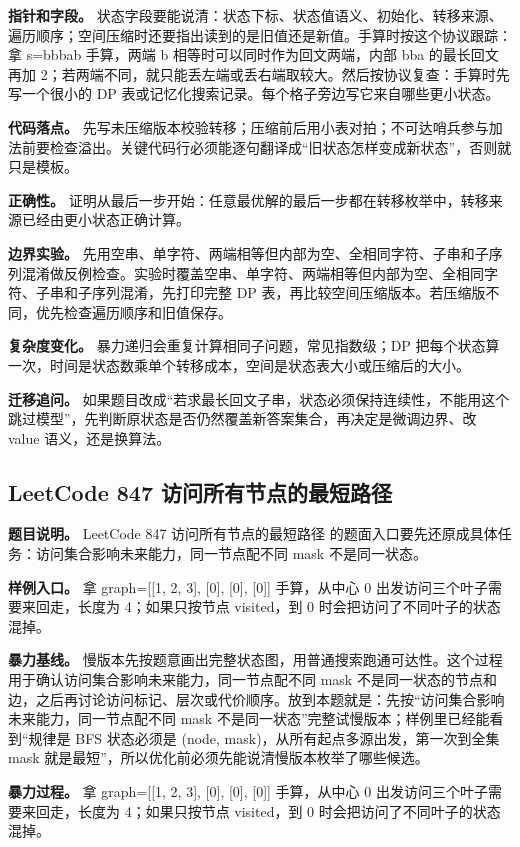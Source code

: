\textbf{指针和字段。} 状态字段要能说清：状态下标、状态值语义、初始化、转移来源、遍历顺序；空间压缩时还要指出读到的是旧值还是新值。手算时按这个协议跟踪：拿 s=bbbab 手算，两端 b 相等时可以同时作为回文两端，内部 bba 的最长回文再加 2；若两端不同，就只能丢左端或丢右端取较大。然后按协议复查：手算时先写一个很小的 DP 表或记忆化搜索记录。每个格子旁边写它来自哪些更小状态。

\textbf{代码落点。} 先写未压缩版本校验转移；压缩前后用小表对拍；不可达哨兵参与加法前要检查溢出。关键代码行必须能逐句翻译成“旧状态怎样变成新状态”，否则就只是模板。

\textbf{正确性。} 证明从最后一步开始：任意最优解的最后一步都在转移枚举中，转移来源已经由更小状态正确计算。

\textbf{边界实验。} 先用空串、单字符、两端相等但内部为空、全相同字符、子串和子序列混淆做反例检查。实验时覆盖空串、单字符、两端相等但内部为空、全相同字符、子串和子序列混淆，先打印完整 DP 表，再比较空间压缩版本。若压缩版不同，优先检查遍历顺序和旧值保存。

\textbf{复杂度变化。} 暴力递归会重复计算相同子问题，常见指数级；DP 把每个状态算一次，时间是状态数乘单个转移成本，空间是状态表大小或压缩后的大小。

\textbf{迁移追问。} 如果题目改成“若求最长回文子串，状态必须保持连续性，不能用这个跳过模型”，先判断原状态是否仍然覆盖新答案集合，再决定是微调边界、改 value 语义，还是换算法。

\subsection{LeetCode 847 访问所有节点的最短路径}

\textbf{题目说明。} LeetCode 847 访问所有节点的最短路径 的题面入口要先还原成具体任务：访问集合影响未来能力，同一节点配不同 mask 不是同一状态。

\textbf{样例入口。} 拿 graph=[[1, 2, 3], [0], [0], [0]] 手算，从中心 0 出发访问三个叶子需要来回走，长度为 4；如果只按节点 visited，到 0 时会把访问了不同叶子的状态混掉。

\textbf{暴力基线。} 慢版本先按题意画出完整状态图，用普通搜索跑通可达性。这个过程用于确认访问集合影响未来能力，同一节点配不同 mask 不是同一状态的节点和边，之后再讨论访问标记、层次或代价顺序。放到本题就是：先按“访问集合影响未来能力，同一节点配不同 mask 不是同一状态”完整试慢版本；样例里已经能看到“规律是 BFS 状态必须是 (node, mask)，从所有起点多源出发，第一次到全集 mask 就是最短”，所以优化前必须先能说清慢版本枚举了哪些候选。

\textbf{暴力过程。} 拿 graph=[[1, 2, 3], [0], [0], [0]] 手算，从中心 0 出发访问三个叶子需要来回走，长度为 4；如果只按节点 visited，到 0 时会把访问了不同叶子的状态混掉。


